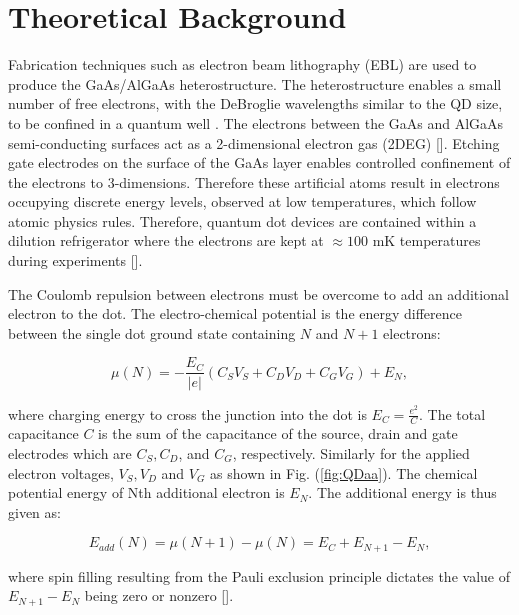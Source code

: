 \section{Theoretical Background}
Fabrication techniques such as electron beam lithography (EBL) are used to produce the GaAs/AlGaAs heterostructure. The heterostructure enables a small number of free electrons, with the DeBroglie wavelengths similar to the QD size, to be confined in a quantum well . The electrons between the GaAs and AlGaAs semi-conducting surfaces act as a 2-dimensional electron gas (2DEG) []. Etching gate electrodes on the surface of the GaAs layer enables controlled confinement of the electrons to 3-dimensions. Therefore these artificial atoms result in electrons occupying discrete energy levels, observed at low temperatures, which follow atomic physics rules. Therefore, quantum dot devices are contained within a dilution refrigerator where the electrons are kept at $\approx100$ mK temperatures during experiments []. 

The Coulomb repulsion between electrons must be overcome to add an additional electron to the dot. The electro-chemical potential is the energy difference between the single dot ground state containing $N$ and $N+1$ electrons: 

\begin{equation}
\label{eq:interactionham0}
\mu (N) = -\frac{E_{C}}{\left | e \right |}(C_{S}V_{S}+C_{D}V_{D}+C_{G}V_{G})+E_{N}, 
\end{equation}

where charging energy to cross the junction into the dot is $E_{C}=\frac{e^{2}}{C}$. The total capacitance $C$ is the sum of the capacitance of the source, drain and gate electrodes which are $C_{S}, C_{D}$, and $C_{G}$, respectively. Similarly for the applied electron voltages, $V_{S}, V_{D}$ and $V_{G}$ as shown in Fig. (\ref{fig:QDaa}). The chemical potential energy of Nth additional electron is $E_{N}$. The additional energy is thus given as: 

\begin{equation}
\label{eq:interactionham0}
E_{add}(N)=\mu(N+1)-\mu(N)=E_{C}+E_{N+1}-E_{N},
\end{equation}

where spin filling resulting from the Pauli exclusion principle dictates the value of $E_{N+1}-E_{N}$ being zero or nonzero []. 
 
